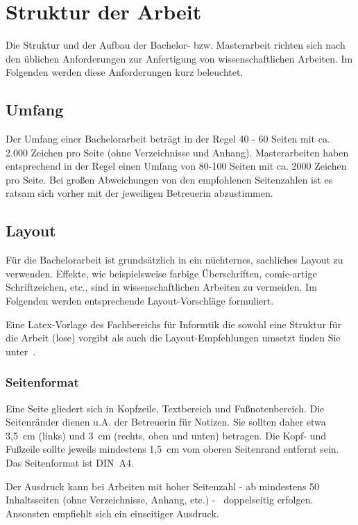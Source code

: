 \section{Struktur der Arbeit}\label{sec:structure}
%
Die Struktur und der Aufbau der Bachelor- bzw. Masterarbeit richten sich nach den üblichen Anforderungen zur Anfertigung von wissenschaftlichen Arbeiten. Im Folgenden werden diese Anforderungen kurz beleuchtet.

\subsection{Umfang}\label{sec:structure:scope}
%
Der Umfang einer Bachelorarbeit beträgt in der Regel 40 - 60 Seiten mit ca. 2.000 Zeichen pro Seite (ohne Verzeichnisse und Anhang). Masterarbeiten haben entsprechend in der Regel einen Umfang von 80-100 Seiten mit ca. 2000 Zeichen pro Seite. Bei großen Abweichungen von den empfohlenen Seitenzahlen ist es ratsam sich vorher mit der jeweiligen Betreuerin abzustimmen.

\subsection{Layout}\label{sec:structure:layout}
%
Für die Bachelorarbeit ist grundsätzlich in ein nüchternes, sachliches Layout zu verwenden. Effekte, wie beispielsweise farbige Überschriften, comic-artige Schriftzeichen, etc., sind in wissenschaftlichen Arbeiten zu vermeiden. Im Folgenden werden entsprechende Layout-Vorschläge formuliert.

Eine Latex-Vorlage des Fachbereichs für Informtik die sowohl eine Struktur für die Arbeit (lose) vorgibt als auch die Layout-Empfehlungen umsetzt finden Sie unter~\cite{mbredel:2020:01}.

\subsubsection{Seitenformat}\label{sec:structure:layout:format}
%
Eine Seite gliedert sich in Kopfzeile, Textbereich und Fußnotenbereich. Die Seitenränder dienen u.A. der Betreuerin für Notizen. Sie sollten daher etwa 3,5~cm (links) und 3~cm (rechts, oben und unten) betragen. Die Kopf- und Fußzeile sollte jeweils mindestens 1,5~cm vom oberen Seitenrand entfernt sein. Das Seitenformat ist DIN~A4.
\smallskip

Der Ausdruck kann bei Arbeiten mit hoher Seitenzahl - ab mindestens 50 Inhaltsseiten (ohne Verzeichnisse, Anhang, etc.) -  doppelseitig erfolgen. Ansonsten empfiehlt sich ein einseitiger Ausdruck.

